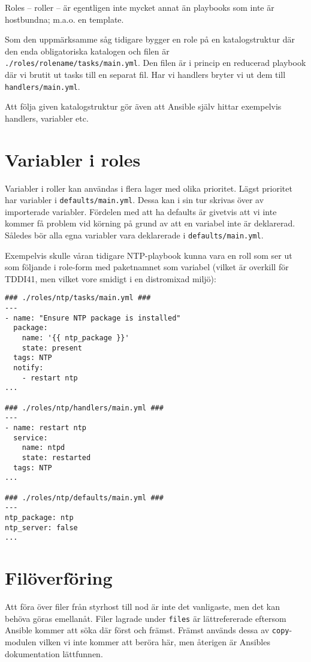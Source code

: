 Roles -- roller -- är egentligen inte mycket annat än playbooks som inte är hostbundna; m.a.o. en template.

Som den uppmärksamme såg tidigare bygger en role på en katalogstruktur där den enda obligatoriska katalogen och 
filen är \texttt{./roles/rolename/tasks/main.yml}. Den filen är i princip en reducerad playbook där vi brutit ut
tasks till en separat fil. Har vi handlers bryter vi ut dem till \texttt{handlers/main.yml}.

Att följa given katalogstruktur gör även att Ansible själv hittar exempelvis handlers, variabler etc.

\section{Variabler i roles}
Variabler i roller kan användas i flera lager med olika prioritet. Lägst prioritet har variabler i 
\texttt{defaults/main.yml}. Dessa kan i sin tur skrivas över av importerade variabler. Fördelen med att ha 
defaults är givetvis att vi inte kommer få problem vid körning på grund av att en variabel inte är deklarerad.
Således bör alla egna variabler vara deklarerade i \texttt{defaults/main.yml}.

Exempelvis skulle våran tidigare NTP-playbook kunna vara en roll som ser ut som följande i role-form med paketnamnet som variabel (vilket är overkill för TDDI41, men vilket vore smidigt i en distromixad miljö):

\begin{verbatim}
### ./roles/ntp/tasks/main.yml ###
---
- name: "Ensure NTP package is installed"
  package:
    name: '{{ ntp_package }}'
    state: present
  tags: NTP
  notify:
    - restart ntp
...

### ./roles/ntp/handlers/main.yml ###
---
- name: restart ntp
  service:
    name: ntpd
    state: restarted
  tags: NTP
...

### ./roles/ntp/defaults/main.yml ###
---
ntp_package: ntp
ntp_server: false
...
\end{verbatim}

\section{Filöverföring}
Att föra över filer från styrhost till nod är inte det vanligaste, men det kan behöva göras emellanåt. Filer
lagrade under \texttt{files} är lättrefererade eftersom Ansible kommer att söka där först och främst.
Främst används dessa av \texttt{copy}-modulen vilken vi inte kommer att beröra här, men återigen är Ansibles
dokumentation lättfunnen.

